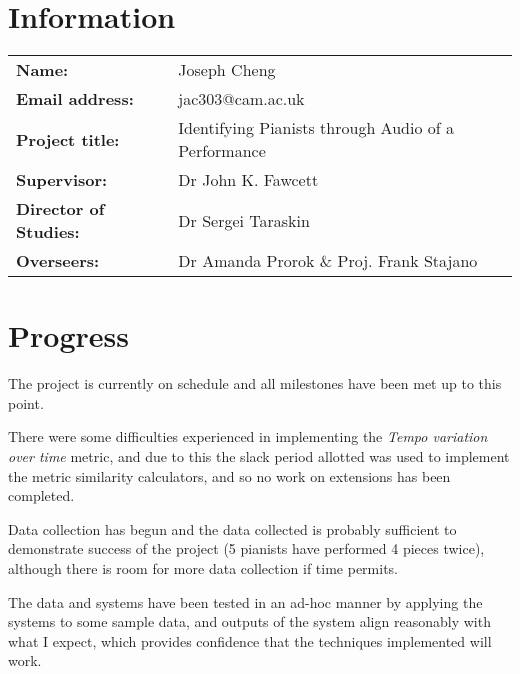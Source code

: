 \documentclass{article}
\begin{document}
\section*{Information}

\begin{tabular}{ll}
    
  \textbf{Name: }&Joseph Cheng \\

  \textbf{Email address: }&jac303@cam.ac.uk \\

  \textbf{Project title: }&Identifying Pianists through Audio of a Performance \\

  \textbf{Supervisor: }&Dr John K. Fawcett \\

  \textbf{Director of Studies: }&Dr Sergei Taraskin \\

  \textbf{Overseers: }&Dr Amanda Prorok \& Proj. Frank Stajano
\end{tabular}

\section*{Progress}

The project is currently on schedule and all milestones have been met up to this point.

There were some difficulties experienced in implementing the \textit{Tempo variation over time} metric, and due to this the slack period allotted was used to implement the metric similarity calculators, and so no work on extensions has been completed.

Data collection has begun and the data collected is probably sufficient to demonstrate success of the project (5 pianists have performed 4 pieces twice), although there is room for more data collection if time permits.

The data and systems have been tested in an ad-hoc manner by applying the systems to some sample data, and outputs of the system align reasonably with what I expect, which provides confidence that the techniques implemented will work.
\end{document}
